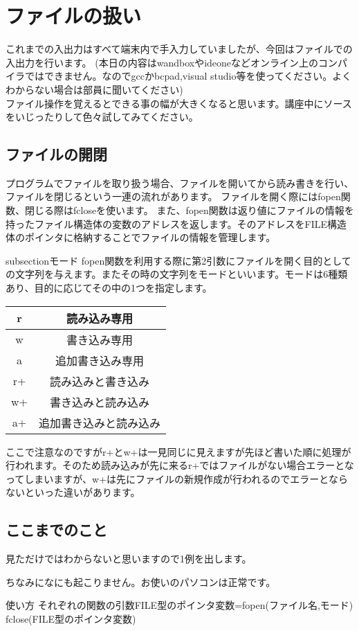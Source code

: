 \section{ファイルの扱い}

これまでの入出力はすべて端末内で手入力していましたが、今回はファイルでの入出力を行います。
(本日の内容はwandboxやideoneなどオンライン上のコンパイラではできません。なのでgccかbcpad,visual studio等を使ってください。よくわからない場合は部員に聞いてください)\\
ファイル操作を覚えるとできる事の幅が大きくなると思います。講座中にソースをいじったりして色々試してみてください。

\subsection{ファイルの開閉}
プログラムでファイルを取り扱う場合、ファイルを開いてから読み書きを行い、ファイルを閉じるという一連の流れがあります。
ファイルを開く際にはfopen関数、閉じる際はfcloseを使います。
また、fopen関数は返り値にファイルの情報を持ったファイル構造体の変数のアドレスを返します。そのアドレスをFILE構造体のポインタに格納することでファイルの情報を管理します。

subsection{モード}
fopen関数を利用する際に第2引数にファイルを開く目的としての文字列を与えます。またその時の文字列をモードといいます。モードは6種類あり、目的に応じてその中の1つを指定します。

\begin{table}[htb]
\begin{center}
\begin{tabular}{|c|c|}

\hline
r&読み込み専用\\ \hline
w&書き込み専用\\ \hline
a&追加書き込み専用\\ \hline
r+&読み込みと書き込み\\ \hline
w+&書き込みと読み込み\\ \hline
a+&追加書き込みと読み込み\\
\hline
\end{tabular}
\end{center}
\end{table}
ここで注意なのですがr+とw+は一見同じに見えますが先ほど書いた順に処理が行われます。そのため読み込みが先に来るr+ではファイルがない場合エラーとなってしまいますが、w+は先にファイルの新規作成が行われるのでエラーとならないといった違いがあります。

\subsection{ここまでのこと}
見ただけではわからないと思いますので1例を出します。



ちなみになにも起こりません。お使いのパソコンは正常です。

\begin{itembox}{使い方}
それぞれの関数の引数FILE型のポインタ変数=fopen(ファイル名,モード)\\
fclose(FILE型のポインタ変数)
\end{itembox}


